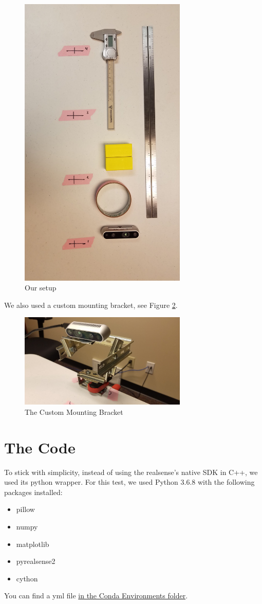 \documentclass{article}
\begin{document}
			\begin{figure}[h]
				\includegraphics[width=8cm]{./images/our_setup.jpg}
				\centering
				\caption{Our setup}
				\label{fig:setup}
			\end{figure}
			
			\newpage
			We also used a custom mounting bracket, see Figure \ref{fig:bracket}.
			
			\begin{figure}[h]
				\includegraphics[width=8cm]{./images/mounting_bracket.jpg}
				\centering
				\caption{The Custom Mounting Bracket}
				\label{fig:bracket}
			\end{figure}
		
		\section{The Code}
			To stick with simplicity, instead of using the realsense's native SDK in C++, we used its python wrapper.  For this test, we used Python 3.6.8 with the following packages installed:
			\begin{itemize}
				\item pillow
				\item numpy
				\item matplotlib
				\item pyrealsense2
				\item cython
			\end{itemize}
			You can find a yml file \href{run:"../../Conda Environments"}{in the Conda Environments folder}.
			
\end{document}
